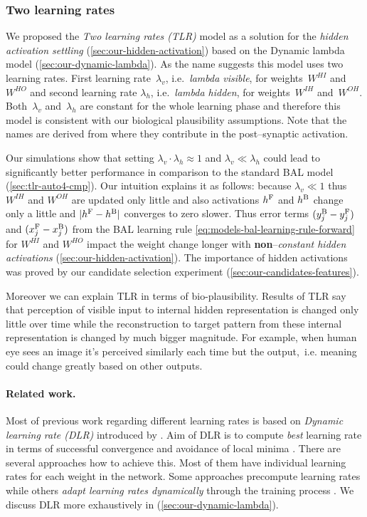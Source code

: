 
\subsubsection{Two learning rates} 
\label{sec:our-tlr}

We proposed the \emph{Two learning rates (TLR)} model as a solution for the \emph{hidden activation settling} (\ref{sec:our-hidden-activation}) based on the Dynamic lambda model (\ref{sec:our-dynamic-lambda}). As the name suggests this model uses two learning rates. First learning rate~$\lambda_v$, i.e.~\emph{lambda visible}, for weights~$W^{HI}$ and~$W^{HO}$ and second learning rate $\lambda_h$, i.e.~\emph{lambda hidden}, for weights~$W^{IH}$ and~$W^{OH}$. Both~$\lambda_v$ and~$\lambda_h$ are constant for the whole learning phase and therefore this model is consistent with our biological plausibility assumptions. Note that the names are derived from where they contribute in the post--synaptic activation. 

Our simulations show that setting $\lambda_v \cdot \lambda_h \approx 1$ and $\lambda_v \ll \lambda_h$ could lead to significantly better performance in comparison to the standard BAL model (\ref{sec:tlr-auto4-cmp}). Our intuition explains it as follows: because $\lambda_v \ll 1$ thus $W^{IH}$ and $W^{OH}$ are updated only little and also activations $h^{\rm F}$ and $h^{\rm B}$ change only a little and $|h^{\rm F}- h^{\rm B}|$ converges to zero slower. Thus error terms $(y_j^{\rm B} - y_j^{\rm F})$ and $(x_j^{\rm F} - x_j^{\rm B})$ from the BAL learning rule \ref{eq:models-bal-learning-rule-forward} for $W^{HI}$ and $W^{HO}$ impact the weight change longer with {\bf non}--\emph{constant hidden activations} (\ref{sec:our-hidden-activation}). The importance of hidden activations was proved by our candidate selection experiment (\ref{sec:our-candidates-features}). 

Moreover we can explain TLR in terms of bio-plausibility. Results of TLR say that perception of visible input to internal hidden representation is changed only little over time while the reconstruction to target pattern from these internal representation is changed by much bigger magnitude. For example, when human eye sees an image it's perceived similarly each time but the output,~i.e. meaning could change greatly based on other outputs. 

\paragraph{Related work.} 
\label{sec:our-tlr-related-work}
Most of previous work regarding different learning rates is based on \emph{Dynamic learning rate (DLR)} introduced by \citet{jacobs1988increased}. Aim of DLR is to compute \emph{best} learning rate in terms of successful convergence and avoidance of local minima \citep{behera2006adaptive}. There are several approaches how to achieve this. Most of them have individual learning rates for each weight in the network. Some approaches precompute learning rates \citep{weir1991method} while others \emph{adapt learning rates dynamically} through the training process \citep{yu1997efficient, magoulas1999improving, yu2002backpropagation}. We discuss DLR more exhaustively in (\ref{sec:our-dynamic-lambda}). 

